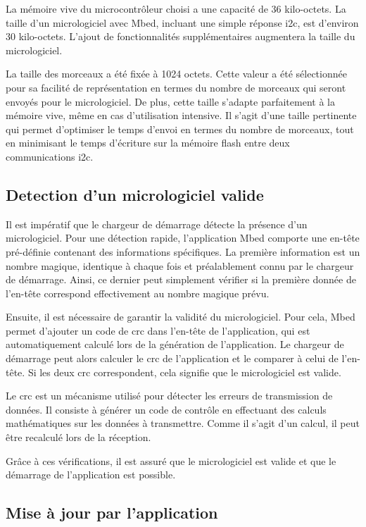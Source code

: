 La mémoire vive du microcontrôleur choisi a une capacité de 36 kilo-octets.
La taille d'un micrologiciel avec Mbed, incluant une simple réponse \gls{i2c}, est d'environ 30 kilo-octets.
L'ajout de fonctionnalités supplémentaires augmentera la taille du micrologiciel.

La taille des morceaux a été fixée à 1024 octets. Cette valeur a été sélectionnée pour sa facilité de représentation en termes du nombre de morceaux qui seront envoyés pour le micrologiciel.
De plus, cette taille s'adapte parfaitement à la mémoire vive, même en cas d'utilisation intensive.
Il s'agit d'une taille pertinente qui permet d'optimiser le temps d'envoi en termes du nombre de morceaux, tout en minimisant le temps d'écriture sur la mémoire flash entre deux communications \gls{i2c}.

\subsection{Detection d'un micrologiciel valide}

Il est impératif que le chargeur de démarrage détecte la présence d'un micrologiciel.
Pour une détection rapide, l'application Mbed comporte une en-tête pré-définie contenant des informations spécifiques.
La première information est un nombre magique, identique à chaque fois et préalablement connu par le chargeur de démarrage.
Ainsi, ce dernier peut simplement vérifier si la première donnée de l'en-tête correspond effectivement au nombre magique prévu.

Ensuite, il est nécessaire de garantir la validité du micrologiciel.
Pour cela, Mbed permet d'ajouter un code de \gls{crc} dans l'en-tête de l'application, qui est automatiquement calculé lors de la génération de l'application.
Le chargeur de démarrage peut alors calculer le \gls{crc} de l'application et le comparer à celui de l'en-tête.
Si les deux \gls{crc} correspondent, cela signifie que le micrologiciel est valide.

Le \gls{crc} est un mécanisme utilisé pour détecter les erreurs de transmission de données.
Il consiste à générer un code de contrôle en effectuant des calculs mathématiques sur les données à transmettre.
Comme il s'agit d'un calcul, il peut être recalculé lors de la réception.

Grâce à ces vérifications, il est assuré que le micrologiciel est valide et que le démarrage de l'application est possible.

\subsection{Mise à jour par l'application}

